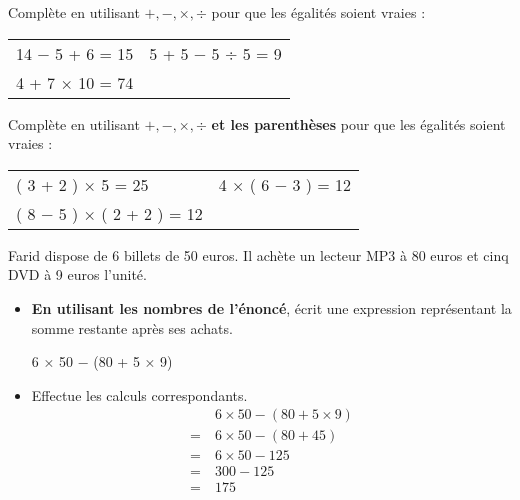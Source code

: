 \documentclass[a4paper,11pt]{article}
\newcommand{\red}{\color{red}}
\begin{document}
\begin{question}[(3 points)] Complète en utilisant $+,-,×,÷$ pour que les égalités soient vraies :

	\vspace{1em}
	\noindent
	\begin{tabular}{p{}p{}}
		14 {\red −} 5 {\red +} 6 = 15 &
		5 {\red +} 5 {\red −} 5 {\red ÷} 5 = 9 \vspace{0.5em} \\
		4 {\red +} 7 {\red ×} 10 = 74 &
	\end{tabular}
	\vspace{1em}

	Complète en utilisant $+,-,×,÷$ \textbf{et les parenthèses} pour que les égalités soient vraies :

	\vspace{1em}
	\noindent
	\begin{tabular}{p{}p{}}
		{\red (} 3 {\red +} 2 {\red ) ×} 5 = 25                       &
		4 {\red × (} 6 {\red −} 3 {\red )} = 12 \vspace{0.5em}          \\
		{\red (} 8 {\red −} 5 {\red ) × (} 2 {\red +} 2 {\red )} = 12 &
	\end{tabular}
	\vspace{1em}
\end{question}

\begin{question}[(3 points)]
	Farid dispose de 6 billets de 50 euros. Il achète un lecteur MP3 à 80 euros et cinq DVD à 9 euros l'unité.
	\begin{itemize}
		\item \textbf{En utilisant les nombres de l'énoncé}, écrit une expression représentant la somme restante après ses achats.

			      {\red 6 × 50 − (80 + 5 × 9)}
		\item Effectue les calculs correspondants.
			      {\red \begin{align*}
					        & \ 6 × 50 - (80 + 5 × 9) \\
					      = & \ 6 × 50 - (80 + 45)    \\
					      = & \ 6 × 50 - 125          \\
					      = & \ 300 - 125             \\
					      = & \ 175
				      \end{align*} }
	\end{itemize}
\end{question}
\end{document}
